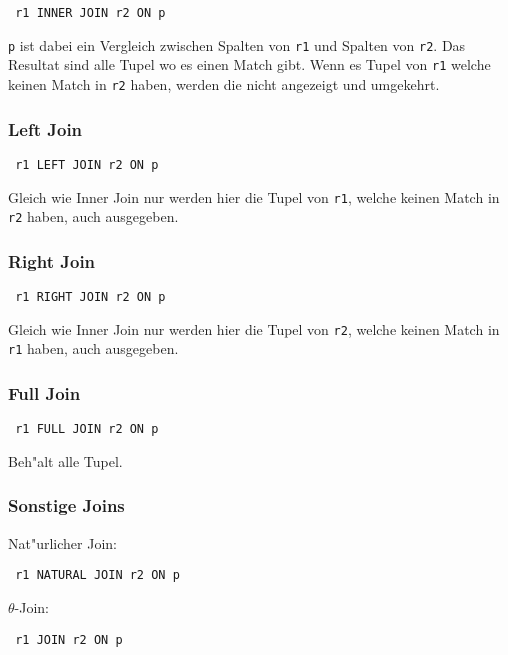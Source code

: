 \documentclass[german, 10pt, a4paper, twocolumn]{scrartcl}
\theoremstyle{definition}
\theoremstyle{remark}
\theoremstyle{example}
\begin{document}
\begin{verbatim}
 r1 INNER JOIN r2 ON p
\end{verbatim}

\verb#p# ist dabei ein Vergleich zwischen Spalten von \verb#r1# und Spalten von \verb#r2#. Das Resultat sind alle Tupel wo es einen Match gibt. Wenn es Tupel von \verb#r1# welche keinen Match in \verb#r2# haben, werden die nicht angezeigt und umgekehrt.


\subsubsection{Left Join}

\begin{verbatim}
 r1 LEFT JOIN r2 ON p
\end{verbatim}

Gleich wie Inner Join nur werden hier die Tupel von \verb#r1#, welche keinen Match in \verb#r2# haben, auch ausgegeben.


\subsubsection{Right Join}

\begin{verbatim}
 r1 RIGHT JOIN r2 ON p
\end{verbatim}

Gleich wie Inner Join nur werden hier die Tupel von \verb#r2#, welche keinen Match in \verb#r1# haben, auch ausgegeben.


\subsubsection{Full Join}

\begin{verbatim}
 r1 FULL JOIN r2 ON p
\end{verbatim}

Beh"alt alle Tupel.


\subsubsection{Sonstige Joins}

Nat"urlicher Join:
\begin{verbatim}
 r1 NATURAL JOIN r2 ON p
\end{verbatim}

$\theta$-Join:
\begin{verbatim}
 r1 JOIN r2 ON p
\end{verbatim}
\end{document}

